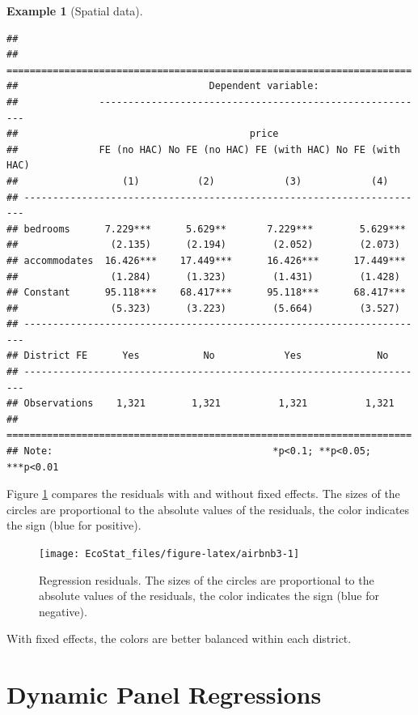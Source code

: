 \documentclass[
  12pt,
]{book}
\theoremstyle{definition}
\theoremstyle{definition}
\newtheorem{example}{Example}[chapter]
\theoremstyle{definition}
\theoremstyle{definition}
\theoremstyle{remark}
\begin{document}
\begin{example}[Spatial data]
\begin{verbatim}
## 
## ======================================================================
##                                 Dependent variable:                   
##              ---------------------------------------------------------
##                                        price                          
##              FE (no HAC) No FE (no HAC) FE (with HAC) No FE (with HAC)
##                  (1)          (2)            (3)            (4)       
## ----------------------------------------------------------------------
## bedrooms      7.229***      5.629**       7.229***        5.629***    
##                (2.135)      (2.194)        (2.052)        (2.073)     
## accommodates  16.426***    17.449***      16.426***      17.449***    
##                (1.284)      (1.323)        (1.431)        (1.428)     
## Constant      95.118***    68.417***      95.118***      68.417***    
##                (5.323)      (3.223)        (5.664)        (3.527)     
## ----------------------------------------------------------------------
## District FE      Yes           No            Yes             No       
## ----------------------------------------------------------------------
## Observations    1,321        1,321          1,321          1,321      
## ======================================================================
## Note:                                      *p<0.1; **p<0.05; ***p<0.01
\end{verbatim}

Figure \ref{fig:airbnb3} compares the residuals with and without fixed effects. The sizes of the circles are proportional to the absolute values of the residuals, the color indicates the sign (blue for positive).

\begin{figure}
\texttt{[image: EcoStat\_files/figure-latex/airbnb3-1]} \caption{Regression residuals. The sizes of the circles are proportional to the absolute values of the residuals, the color indicates the sign (blue for negative).}\label{fig:airbnb3}
\end{figure}

With fixed effects, the colors are better balanced within each district.
\end{example}

\hypertarget{DynPanel}{%
\section{Dynamic Panel Regressions}\label{DynPanel}}
\end{document}
